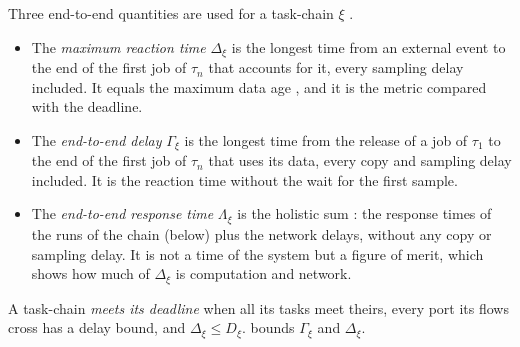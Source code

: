 Three end-to-end quantities are used for a task-chain $\xi$
\cite{feiertag2008compositional,becker2017end,durr2019end}.
\begin{itemize}
\item The \emph{maximum reaction time} $\Delta_\xi$ is the longest time
from an external event to the end of the first job of $\tau_n$ that
accounts for it, every sampling delay included. It equals the maximum
data age \cite{gunzel2023equivalence}, and it is the metric compared with
the deadline.
\item The \emph{end-to-end delay} $\Gamma_\xi$ is the longest time from the
release of a job of $\tau_1$ to the end of the first job of $\tau_n$ that
uses its data, every copy and sampling delay included. It is the reaction
time without the wait for the first sample.
\item The \emph{end-to-end response time} $\Lambda_\xi$ is the holistic
sum \cite{tindell1994holistic}: the response times of the runs of the
chain (below) plus the network delays, without any copy or sampling
delay. It is not a time of the system but a figure of merit, which shows
how much of $\Delta_\xi$ is computation and network.
\end{itemize}
A task-chain \emph{meets its deadline} when all its tasks meet theirs,
every port its flows cross has a delay bound, and $\Delta_\xi\le D_\xi$.
 bounds $\Gamma_\xi$ and $\Delta_\xi$.

